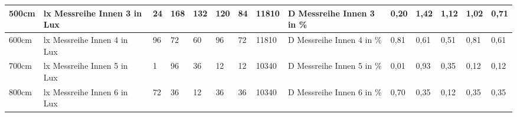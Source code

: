 \begin{table}[H]
{\begin{tabular}{|l|l|l|l|l|l|l|l|l|l|l|l|l|l|}
  \rowcolor[HTML]{C6E0B4} 
  500cm                                             & lx   Messreihe Innen 3 in Lux                                   & 24                                & 168                               & 132                               & 120                               & 84                                & \cellcolor[HTML]{A9D08E}11810                                 & D   Messreihe Innen 3 in \%                                     & 0,20                                      & 1,42                                       & 1,12                                       & 1,02                                       & 0,71                                       \\ \hline
  \rowcolor[HTML]{E2EFDA} 
  600cm                                             & lx   Messreihe Innen 4 in Lux                                   & 96                                & 72                                & 60                                & 96                                & 72                                & \cellcolor[HTML]{A9D08E}11810                                 & D   Messreihe Innen 4 in \%                                     & 0,81                                      & 0,61                                       & 0,51                                       & 0,81                                       & 0,61                                       \\ \hline
  \rowcolor[HTML]{C6E0B4} 
  700cm                                             & lx  Messreihe Innen 5 in Lux                                    & 1                                 & 96                                & 36                                & 12                                & 12                                & \cellcolor[HTML]{A9D08E}10340                                 & D  Messreihe Innen 5 in \%                                      & 0,01                                      & 0,93                                       & 0,35                                       & 0,12                                       & 0,12                                       \\ \hline
  \rowcolor[HTML]{E2EFDA} 
  800cm                                             & lx   Messreihe Innen 6 in Lux                                   & 72                                & 36                                & 12                                & 36                                & 36                                & \cellcolor[HTML]{A9D08E}10340                                 & D   Messreihe Innen 6 in \%                                     & 0,70                                      & 0,35                                       & 0,12                                       & 0,35                                       & 0,35                                       \\ \hline
  \end{tabular}%
  }
  \end{table}
